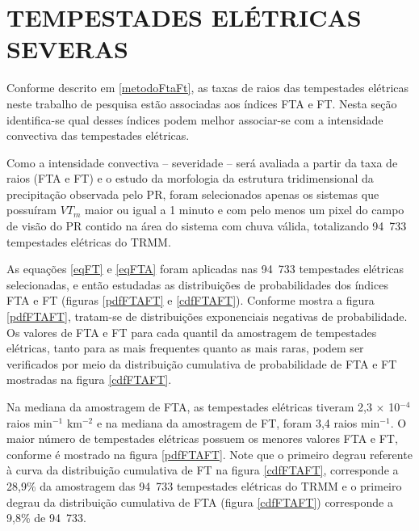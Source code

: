 \chapter{TEMPESTADES ELÉTRICAS SEVERAS}

Conforme descrito em \ref{metodoFtaFt}, as taxas de raios das tempestades elétricas neste trabalho de pesquisa estão associadas aos índices FTA e FT. Nesta seção identifica-se qual desses índices podem melhor associar-se com a intensidade convectiva das tempestades elétricas.

Como a intensidade convectiva -- severidade -- será avaliada a partir da taxa de raios (FTA e FT) e o estudo da morfologia da estrutura tridimensional da precipitação observada pelo PR, foram selecionados apenas os sistemas que possuíram $VT_m$ maior ou igual a 1 minuto e com pelo menos um pixel do campo de visão do PR contido na área do sistema com chuva válida, totalizando {94~733} tempestades elétricas do TRMM.  


As equações \ref{eqFT} e \ref{eqFTA} foram aplicadas nas {94~733} tempestades elétricas selecionadas, e então estudadas as distribuições de probabilidades dos índices FTA e FT (figuras \ref{pdfFTAFT} e \ref{cdfFTAFT}). Conforme mostra a figura \ref{pdfFTAFT}, tratam-se de distribuições exponenciais negativas de probabilidade. Os valores de FTA e FT para cada quantil da amostragem de tempestades elétricas, tanto para as mais frequentes quanto as mais raras, podem ser verificados por meio da distribuição cumulativa de probabilidade de FTA e FT mostradas na figura \ref{cdfFTAFT}. 

Na mediana da amostragem de FTA,  as tempestades elétricas tiveram 2,3 $\times$ 10$^{-4}$ raios min$^{-1}$ km$^{-2}$  e na mediana da amostragem de FT, foram 3,4 raios min$^{-1}$. O maior número de tempestades elétricas possuem os menores valores FTA e FT, conforme é mostrado na figura \ref{pdfFTAFT}. Note que o primeiro degrau referente à curva da distribuição cumulativa de FT na figura \ref{cdfFTAFT}, corresponde a 28,9\% da amostragem das {94~733} tempestades elétricas do TRMM e o primeiro degrau da distribuição cumulativa de FTA (figura \ref{cdfFTAFT}) corresponde a 9,8\% de {94~733}. 

